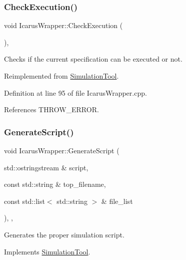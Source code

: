 \subsubsection{\texorpdfstring{Check\+Execution()}{CheckExecution()}}
{\footnotesize\ttfamily void Icarus\+Wrapper\+::\+Check\+Execution (\begin{DoxyParamCaption}{ }\end{DoxyParamCaption})\hspace{0.3cm}{\ttfamily [override]}, {\ttfamily [virtual]}}



Checks if the current specification can be executed or not. 



Reimplemented from \hyperlink{classSimulationTool_a24b4cde0b09c7496918d20f3896989b6}{Simulation\+Tool}.



Definition at line 95 of file Icarus\+Wrapper.\+cpp.



References T\+H\+R\+O\+W\+\_\+\+E\+R\+R\+OR.

\mbox{\label{classIcarusWrapper_adf6d3591e5e20f081e89122563c04176}} 
\subsubsection{\texorpdfstring{Generate\+Script()}{GenerateScript()}}
{\footnotesize\ttfamily void Icarus\+Wrapper\+::\+Generate\+Script (\begin{DoxyParamCaption}\item[{std\+::ostringstream \&}]{script,  }\item[{const std\+::string \&}]{top\+\_\+filename,  }\item[{const std\+::list$<$ std\+::string $>$ \&}]{file\+\_\+list }\end{DoxyParamCaption})\hspace{0.3cm}{\ttfamily [override]}, {\ttfamily [private]}, {\ttfamily [virtual]}}



Generates the proper simulation script. 



Implements \hyperlink{classSimulationTool_afd99529bb7adb46081071097ceae7643}{Simulation\+Tool}.



